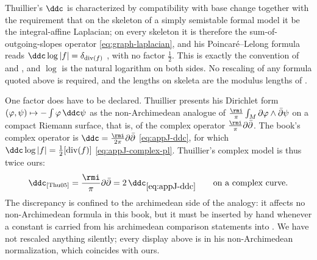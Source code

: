 \begin{remark}
\label{rem:ch25-thuillier-normalization}
Thuillier's \(\ddc\) is characterized by compatibility with base change
together with the requirement that on the skeleton of a simply semistable
formal model it be the integral-affine Laplacian; on every skeleton it is
therefore the sum-of-outgoing-slopes operator \eqref{eq:graph-laplacian},
and his Poincar\'e--Lelong formula reads
\(\ddc\log|f|=\delta_{\operatorname{div}(f)}\)
\cite[Proposition~3.3.15]{Thu05}, with no factor \(\tfrac12\).  This is
exactly the convention of  and
, and \(\log\) is the natural logarithm on both
sides.  No rescaling of any formula quoted above is required, and the
lengths on skeleta are the modulus lengths of
.

One factor does have to be declared.  Thuillier presents his Dirichlet form
\((\varphi,\psi)\mapsto-\int\varphi\,\ddc\psi\) as the non-Archimedean
analogue of
\(\frac{\rmi}{\pi}\int_M\partial\varphi\wedge\bar\partial\psi\)
on a compact Riemann surface, that is, of the complex operator
\(\frac{\rmi}{\pi}\partial\bar\partial\).  The book's complex operator is
\(\ddc=\frac{\rmi}{2\pi}\partial\bar\partial\) \eqref{eq:appJ-ddc}, for which
\(\ddc\log|f|=\tfrac12[\operatorname{div}(f)]\)
\eqref{eq:appJ-complex-pl}.  Thuillier's complex model is thus twice ours:
\[
 \ddc_{\text{\cite{Thu05}}}
 =\frac{\rmi}{\pi}\partial\bar\partial
 =2\,\ddc_{\eqref{eq:appJ-ddc}}
 \qquad\text{on a complex curve.}
\]
The discrepancy is confined to the archimedean side of the analogy: it
affects no non-Archimedean formula in this book, but it must be inserted by
hand whenever a constant is carried from his archimedean comparison
statements into .  We have not rescaled anything
silently; every display above is in his non-Archimedean normalization, which
coincides with ours.
\end{remark}

